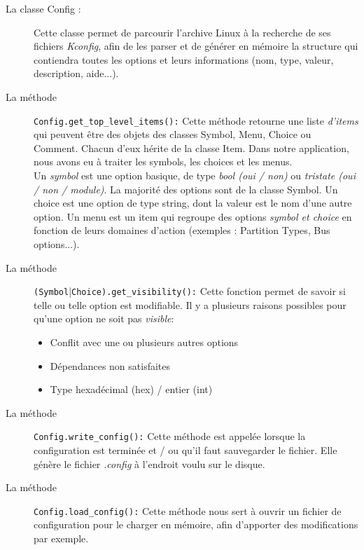 ﻿\documentclass[17pts]{report}
\begin{document}
\begin{description}
    \item[La classe Config :] Cette classe permet de parcourir l'archive Linux
        à la recherche de ses fichiers \textit{Kconfig}, afin de les parser et
        de générer en mémoire la structure qui contiendra toutes les options et
        leurs informations (nom, type, valeur, description, aide...).
    \item[La méthode ] \verb|Config.get_top_level_items():| Cette méthode
        retourne une liste \textit{d'items} qui peuvent être des objets des
        classes Symbol, Menu, Choice ou Comment. Chacun d'eux hérite de la
        classe Item.  Dans notre application, nous avons eu à traiter les
        symbols, les choices et les menus.\\

        Un \textit{symbol} est une option basique, de type \textit{bool (oui /
        non)} ou \textit{tristate (oui / non / module)}. La majorité des
        options sont de la classe Symbol.  Un choice est une option de type
        string, dont la valeur est le nom d'une autre option.  Un menu est un
        item qui regroupe des options \textit{symbol et choice} en fonction de
        leurs domaines d'action (exemples : Partition Types, Bus options...).
    \item[La méthode ] \verb|(Symbol||\verb|Choice).get_visibility():| Cette
        fonction permet  de savoir si telle ou telle option est modifiable. Il
        y a plusieurs raisons possibles pour qu'une option ne soit pas
        \textit{visible}:
        \begin{itemize}
            \item Conflit avec une ou plusieurs autres options
            \item Dépendances non satisfaites
            \item Type hexadécimal (hex) / entier (int) \newline
        \end{itemize}
    \item[La méthode ] \verb|Config.write_config():| Cette méthode est appelée
        lorsque la configuration est terminée et / ou qu'il faut sauvegarder le
        fichier. Elle génère le fichier \textit{.config} à l'endroit voulu sur
        le disque. \newline
    \item[La méthode ] \verb|Config.load_config():| Cette méthode nous sert à
        ouvrir un fichier de configuration pour le charger en mémoire, afin
        d'apporter des modifications par exemple.
\end{description}
\end{document}
